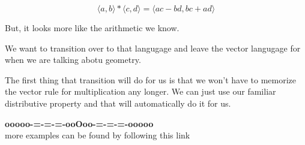 \documentclass{ximera}
\begin{document}
\[    \langle a, b \rangle  * \langle c, d \rangle =   \langle a c - b d, b c + a d \rangle   \]



But, it looks more like the arithmetic we know.  


We want to transition over to that langugage and leave the vector langugage for when we are talking abotu geometry.


The first thing that transition will do for us is that we won't have to memorize the vector rule for multiplication any longer.  We can just use our familiar distributive property and that will automatically do it for us.























\begin{center}
\textbf{\textcolor{green!50!black}{ooooo-=-=-=-ooOoo-=-=-=-ooooo}} \\

more examples can be found by following this link\\ 

\end{center}
\end{document}
